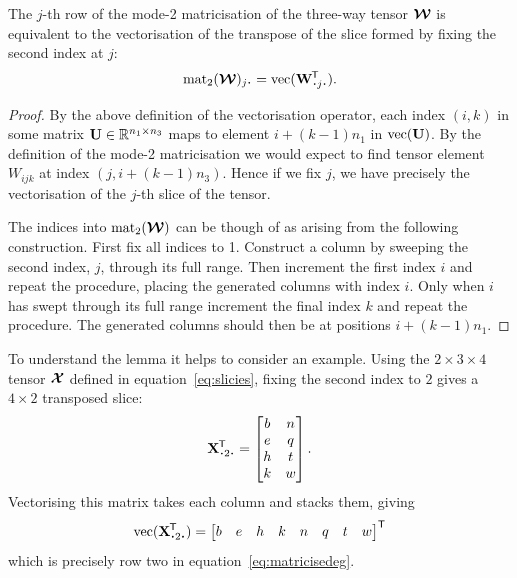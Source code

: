 \begin{lem}
The \(j\)-th row of the mode-2 matricisation of the three-way tensor \(\bm{\mathcal{W}}\)
is equivalent to the vectorisation of the transpose of the slice formed by fixing the second index 
at \(j\):
\begin{equation}\label{eq:matlemstatement}
	\matr_2 (\tensor{W})_{j \midbullet} = \vect(\tran{\mat{W}_{\midbullet j \midbullet}}).
\end{equation}
\label{lem:matricise}
\end{lem}
\begin{proof}
By the above definition of the vectorisation operator, each index \((i, k)\) in some matrix
\(\mathbf{U} \in \mathbb{R}^{n_1\times n_3}\) maps to element \(i + (k-1)n_1\) in
\(\operatorname{vec}(\mathbf{U})\). By the definition of the mode-2 matricisation we would expect to
find tensor element \(W_{ijk}\) at index \((j, i + (k-1)n_3)\). Hence if we fix \(j\), we have
precisely the vectorisation of the \(j\)-th slice of the tensor.

The indices into \(\operatorname{mat}_2(\bm{\mathcal{W}})\) can be though of as arising from the following construction.
First fix all indices to 1. Construct a column by sweeping the second index, \(j\),
through its full range. Then increment the first index \(i\) and repeat the procedure, placing
the generated columns with index \(i\). Only when \(i\) has swept through its full range
increment the final index \(k\) and repeat the procedure. The generated columns should then be
at positions \(i + (k-1)n_1\).
\end{proof}

To understand the lemma it helps to consider an example. Using the \(2 \times 3 \times 4\)
tensor \(\bm{\mathcal{X}}\) defined
in equation~\eqref{eq:slicies}, fixing the second index to \(2\) gives a \(4 \times 2\) 
transposed slice:
\begin{equation}\label{eq:mode2slice}
	\tran{\mat{X}_{\midbullet 2 \midbullet}} = \begin{bmatrix}
		b & n \\
		e & q \\
		h & t \\
		k & w
	\end{bmatrix}.
\end{equation} Vectorising this matrix takes each column and stacks them, giving
\begin{equation}\label{eq:veceg}
	\vect(\tran{\mat{X}_{\midbullet 2 \midbullet}}) = \begin{bmatrix}
		b &
		e &
		h &
		k &
		n &
		q &
		t &
		w
	\end{bmatrix}^\mathsf{T}
\end{equation} which is precisely row two in equation~\eqref{eq:matricisedeg}.


